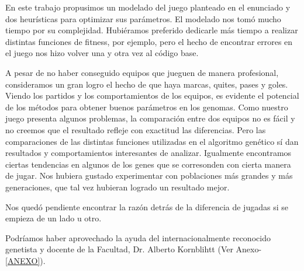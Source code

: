 En este trabajo propusimos un modelado del juego planteado en el enunciado y dos heurísticas para optimizar sus parámetros.
El modelado nos tomó mucho tiempo por su complejidad.
Hubiéramos preferido dedicarle más tiempo a realizar distintas funciones de fitness, por ejemplo, pero el hecho de encontrar errores en el juego nos hizo volver una y otra vez al código base.

A pesar de no haber conseguido equipos que jueguen de manera profesional, consideramos un gran logro el hecho de que haya marcas, quites, pases y goles.
Viendo los partidos y los comportamientos de los equipos, es evidente el potencial de los métodos para obtener buenos parámetros en los genomas.
Como nuestro juego presenta algunos problemas, la comparación entre dos equipos no es fácil y no creemos que el resultado refleje con exactitud las diferencias. Pero las comparaciones de las distintas funciones utilizadas en el algoritmo genético sí dan resultados y comportamientos interesantes de analizar.
Igualmente encontramos ciertas tendencias en algunos de los genes que se corresonden con cierta manera de jugar.
Nos hubiera gustado experimentar con poblaciones más grandes y más generaciones, que tal vez hubieran logrado un resultado mejor.

Nos quedó pendiente encontrar la razón detrás de la diferencia de jugadas si se empieza de un lado u otro.

Podríamos haber aprovechado la ayuda del internacionalmente reconocido genetista y docente de la Facultad, Dr. Alberto Kornblihtt (Ver Anexo-\ref{ANEXO}).




















